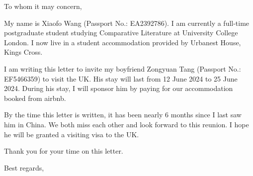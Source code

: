 \documentclass{letter}
\begin{document}
\begin{letter}{}

\opening{To whom it may concern,}

My name is Xiaofo Wang (Passport No.: EA2392786). I am currently a full-time postgraduate student studying Comparative Literature at University College London. I now live in a student accommodation provided by Urbanest House, Kings Cross. 

I am writing this letter to invite my boyfriend Zongyuan Tang (Passport No.: EF5466359) to visit the UK. His stay will last from 12 June 2024 to 25 June 2024. During his stay, I will sponsor him by paying for our accommodation booked from airbnb.

By the time this letter is written, it has been nearly 6 months since I last saw him in China. We both miss each other and look forward to this reunion. I hope he will be granted a visiting visa to the UK.

Thank you for your time on this letter.

\closing{Best regards,\\
\\
}

    
    
    
\end{letter}
\end{document}
